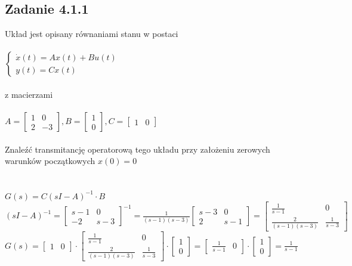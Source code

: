 \subsection*{Zadanie 4.1.1} {\color{darkgray}
	Układ jest opisany równaniami stanu w postaci\\\\
	$\begin{cases} \dot{x}(t)=Ax(t)+Bu(t)\\y(t)=Cx(t)\end{cases}$\\\\
	z macierzami\\\\
	$A=\left[\begin{array}{cc}1&0\\2&-3\end{array}\right],
	B=\left[\begin{array}{c}1\\0\end{array}\right],
	C=\left[\begin{array}{cc}	1&0\end{array}\right]
	$\\\\
	Znaleźć transmitancję operatorową tego układu przy założeniu zerowych warunków początkowych $x(0)=0$\\
}\lineh
\\\\
$G(s)=C(sI-A)^{-1} \cdot B$\\
$(sI-A)^{-1}=\left[\begin{array}{cc}s-1&0\\-2&s-3\end{array}\right]^{-1}=\frac{1}{(s-1)(s-3)}\left[\begin{array}{cc}s-3&0\\2&s-1\end{array}\right]=\left[\begin{array}{cc}\frac{1}{s-1}&0\\\frac{2}{(s-1)(s-3)}&\frac{1}{s-3}\end{array}\right]$\\
$G(s)=\left[\begin{array}{cc}1&0\end{array}\right]\cdot\left[\begin{array}{cc}\frac{1}{s-1}&0\\\frac{2}{(s-1)(s-3)}&\frac{1}{s-3}\end{array}\right]\cdot \left[\begin{array}{c}1\\0\end{array}\right]=\left[\begin{array}{cc}\frac{1}{s-1}&0\end{array}\right] \cdot \left[\begin{array}{c}1\\0\end{array}\right]=\frac{1}{s-1}$\\



